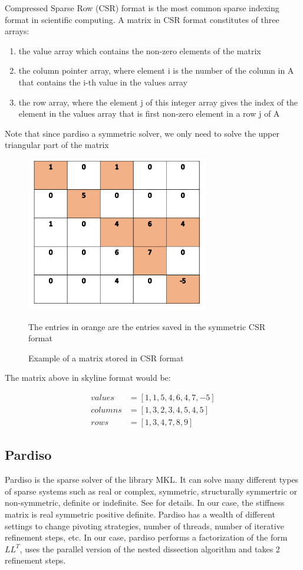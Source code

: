 \documentclass[11pt]{article}
\begin{document}
Compressed Sparse Row (CSR) format is the most common sparse indexing format in scientific computing. A matrix in CSR format constitutes of three arrays:
\begin{enumerate}
\item the value array which contains the non-zero elements of the matrix
\item the column pointer array, where element i is the number of the column in A that contains the i-th value in the values array
\item the row array, where the element j of this integer array gives the index of the element in the values array that is first non-zero element in a row j of A
\end{enumerate}
Note that since pardiso a symmetric solver, we only need to solve the upper triangular part of the matrix
\begin{figure}[H]
\begin{center}

\includegraphics[width=8cm]{csr}
\label{fig:csr}\\
\caption{Example of a matrix stored in CSR format}
The entries in orange are the entries saved in the symmetric CSR format
\end{center}
\end{figure}

The matrix above in skyline format would be:

\begin{align}
values&=[1,1,5,4,6,4,7,-5]\\
columns&= [1,3,2,3,4,5,4,5] \\
rows&= [1,3,4,7,8,9] 
\end{align}

\subsection{Pardiso}
Pardiso is the sparse solver of the library MKL. It can solve many different types of sparse systems such as real or complex, symmetric, structurally symmertric or non-symmetric, definite or indefinite. See \cite{Intel} for details. In our case, the stiffness matrix is real symmetric positive definite. Pardiso has a wealth of different settings to change pivoting strategies, number of threads, number of iterative refinement steps, etc. In our case, pardiso performs a factorization of the form $LL^T$, uses the parallel version of the nested dissection algorithm and takes 2 refinement steps. 
\end{document}
